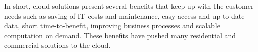 

In short, cloud solutions present several benefits that keep up with the customer needs such as saving of IT costs and maintenance, easy access and up-to-date data, short time-to-benefit, improving business processes and scalable computation on demand. 
These benefits have pushed many residential and commercial solutions to the cloud. 






